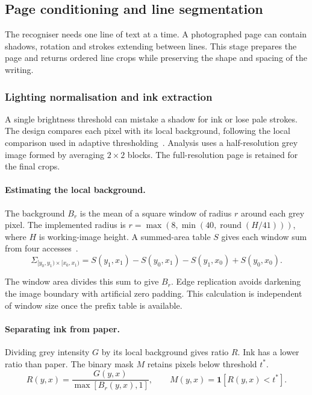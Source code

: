 \subsection{Page conditioning and line segmentation}
\label{sec:des-seg}
The recogniser needs one line of text at a time. A photographed page can contain shadows, rotation and strokes extending between lines. This stage prepares the page and returns ordered line crops while preserving the shape and spacing of the writing.

\subsubsection{Lighting normalisation and ink extraction}
A single brightness threshold can mistake a shadow for ink or lose pale strokes. The design compares each pixel with its local background, following the local comparison used in adaptive thresholding~\cite[pp.~2--3]{bradley2007}. Analysis uses a half-resolution grey image formed by averaging $2\times2$ blocks. The full-resolution page is retained for the final crops.

\paragraph{Estimating the local background.}
The background $B_r$ is the mean of a square window of radius $r$ around each grey pixel. The implemented radius is $r=\max(8,\min(40,\operatorname{round}(H/41)))$, where $H$ is working-image height. A summed-area table $S$ gives each window sum from four accesses~\cite[p.~2]{bradley2007}.
\begin{equation}
\Sigma_{[y_0,y_1)\times[x_0,x_1)}=
S(y_1,x_1)-S(y_0,x_1)-S(y_1,x_0)+S(y_0,x_0).
\label{eq:des-integral}
\end{equation}

The window area divides this sum to give $B_r$. Edge replication avoids darkening the image boundary with artificial zero padding. This calculation is independent of window size once the prefix table is available.

\paragraph{Separating ink from paper.}
Dividing grey intensity $G$ by its local background gives ratio $R$. Ink has a lower ratio than paper. The binary mask $M$ retains pixels below threshold $t^*$.
\begin{equation}
R(y,x)=\frac{G(y,x)}{\max[B_r(y,x),1]},\qquad
M(y,x)=\mathbf{1}[R(y,x)<t^*].
\label{eq:des-ratio}
\end{equation}

